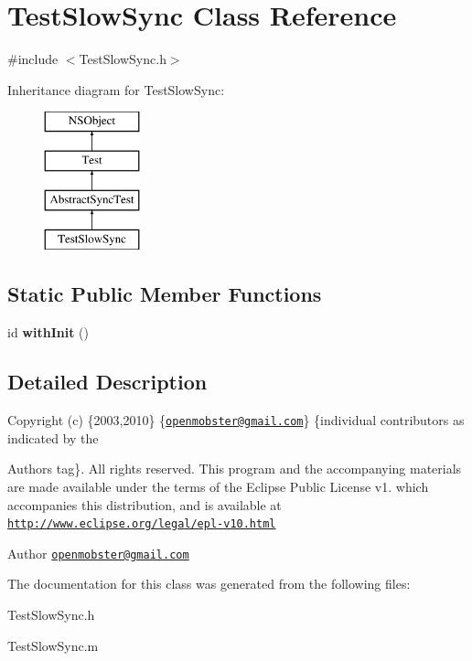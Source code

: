 \hypertarget{interface_test_slow_sync}{
\section{\-Test\-Slow\-Sync \-Class \-Reference}
\label{interface_test_slow_sync}
}


{\ttfamily \#include $<$\-Test\-Slow\-Sync.\-h$>$}

\-Inheritance diagram for \-Test\-Slow\-Sync\-:\begin{figure}[H]
\begin{center}
\leavevmode
\includegraphics[height=4.000000cm]{interface_test_slow_sync}
\end{center}
\end{figure}
\subsection*{\-Static \-Public \-Member \-Functions}
\begin{DoxyCompactItemize}
\item 
\hypertarget{interface_test_slow_sync_a934a775a052200866aea08d044ab91ae}{
id {\bfseries with\-Init} ()}
\label{interface_test_slow_sync_a934a775a052200866aea08d044ab91ae}

\end{DoxyCompactItemize}


\subsection{\-Detailed \-Description}
\-Copyright (c) \{2003,2010\} \{\href{mailto:openmobster@gmail.com}{\tt openmobster@gmail.\-com}\} \{individual contributors as indicated by the \begin{DoxyAuthor}{\-Authors}
tag\}. \-All rights reserved. \-This program and the accompanying materials are made available under the terms of the \-Eclipse \-Public \-License v1. which accompanies this distribution, and is available at \href{http://www.eclipse.org/legal/epl-v10.html}{\tt http\-://www.\-eclipse.\-org/legal/epl-\/v10.\-html}
\end{DoxyAuthor}
\begin{DoxyAuthor}{\-Author}
\href{mailto:openmobster@gmail.com}{\tt openmobster@gmail.\-com} 
\end{DoxyAuthor}


\-The documentation for this class was generated from the following files\-:\begin{DoxyCompactItemize}
\item 
\-Test\-Slow\-Sync.\-h\item 
\-Test\-Slow\-Sync.\-m\end{DoxyCompactItemize}
